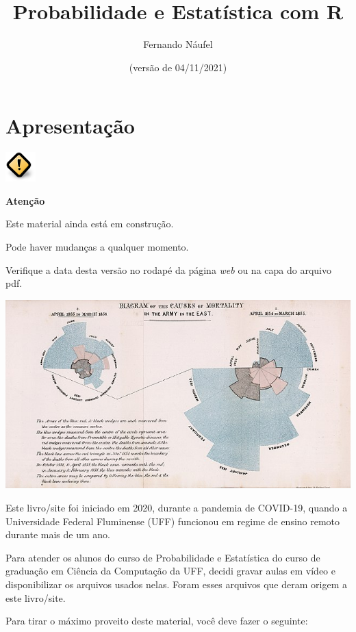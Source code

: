 \documentclass[
  11pt]{report}
\title{Probabilidade e Estatística com R}
\author{Fernando Náufel}
\date{(versão de 04/11/2021)}
\newenvironment{rmdcaution}
{
  \begin{mycaution}
    \includegraphics{images/caution.png}
    \tcblower
  }
  {
  \end{mycaution}
}
\begin{document}
\maketitle

{
\setcounter{tocdepth}{1}
\tableofcontents
}
\hypertarget{apresentacao}{%
\chapter*{Apresentação}\label{apresentacao}}

\begin{rmdcaution}
{\textbf{Atenção}}

Este material ainda está em construção.

Pode haver mudanças a qualquer momento.

Verifique a data desta versão no rodapé da página \emph{web} ou na capa do arquivo pdf.

\end{rmdcaution}

\includegraphics{images/640px-Nightingale-mortality.jpg}

Este livro/site foi iniciado em 2020, durante a pandemia de COVID-19, quando a Universidade Federal Fluminense (UFF) funcionou em regime de ensino remoto durante mais de um ano.

Para atender os alunos do curso de Probabilidade e Estatística do curso de graduação em Ciência da Computação da UFF, decidi gravar aulas em vídeo e disponibilizar os arquivos usados nelas. Foram esses arquivos que deram origem a este livro/site.

Para tirar o máximo proveito deste material, você deve fazer o seguinte:
\end{document}
